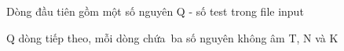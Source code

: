 Dòng đầu tiên gồm một số nguyên Q - số test trong file input

Q dòng tiếp theo, mỗi dòng chứa ba số nguyên không âm T, N và K